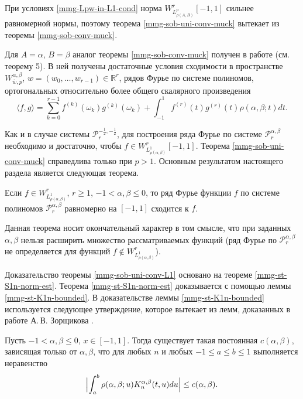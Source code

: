 При условиях \eqref{mmg-Lpw-in-L1-cond} норма $W^r_{L_{\rho(A,B)}^p}[-1,1]$ сильнее равномерной нормы, поэтому теорема \ref{mmg-sob-uni-conv-muck} вытекает из теоремы \ref{mmg-sob-conv-muck}.

Для $A=\alpha$, $B=\beta$ аналог теоремы \ref{mmg-sob-conv-muck} получен в работе \cite{mmg-Diaz-Gonzalez2020} (см. теорему 5). В ней получены достаточные условия сходимости в пространстве $W^{\alpha,\beta}_{\overline{w},p}$, $w=(w_0,\ldots,w_{r-1}) \in \mathbb{R}^r$, рядов Фурье по системе полиномов, ортогональных относительно более общего скалярного произведения
\begin{equation*}
	\langle f, g \rangle = \sum_{k=0}^{r-1} f^{(k)}(\omega_k)g^{(k)}(\omega_k)+\int_{-1}^{1}f^{(r)}(t)g^{(r)}(t)\rho(\alpha,\beta;t)dt.
\end{equation*}



Как и в случае системы $\mathcal{P}^{-\frac12,-\frac12}_r$, для построения ряда Фурье по системе $\mathcal{P}_r^{\alpha,\beta}$ необходимо и достаточно, чтобы $f\in W^r_{L_{\rho(\alpha,\beta)}^1}[-1,1]$. Теорема \ref{mmg-sob-uni-conv-muck} справедлива только при $p>1$. Основным результатом настоящего раздела является следующая теорема.

\begin{theorem}\label{mmg-sob-uni-conv-L1}
	Если $f \in W^r_{L^1_{\rho(\alpha,\beta)}}$, $r \ge 1$, $-1<\alpha,\beta \le 0$, то ряд Фурье функции $f$ по системе полиномов $\mathcal{P}_r^{\alpha,\beta}$ равномерно на $[-1,1]$ сходится к $f$.
\end{theorem}

Данная теорема носит окончательный характер в том смысле, что при заданных $\alpha, \beta$ нельзя расширить множество рассматриваемых функций (ряд Фурье по $\mathcal{P}_r^{\alpha,\beta}$ не определяется для функций $f \notin  W^r_{L^1_{\rho(\alpha,\beta)}}$).

Доказательство теоремы \ref{mmg-sob-uni-conv-L1} основано на теореме \ref{mmg-st-S1n-norm-est}. Теорема \ref{mmg-st-S1n-norm-est} доказывается с помощью леммы \ref{mmg-st-K1n-bounded}. В доказательстве леммы \ref{mmg-st-K1n-bounded} используется следующее утверждение, которое вытекает из лемм, доказанных в работе А.\,В. Зорщикова \cite[леммы 2 и 3]{mmg-Zorschikov1967}.
\begin{lemma}\label{mmg-st-Zor}
	Пусть $-1 < \alpha,\beta \le 0$, $x \in [-1,1]$. Тогда существует такая постоянная $c(\alpha,\beta)$, зависящая только от $\alpha,\beta$, что для любых $n$  и любых $-1 \le a \le b \le 1$ выполняется неравенство
	\begin{equation*}
		\Bigl| \int_a^b \rho(\alpha,\beta;u)K_n^{\alpha,\beta}(t,u)du \Bigr| \le c(\alpha,\beta).
	\end{equation*}
\end{lemma}

